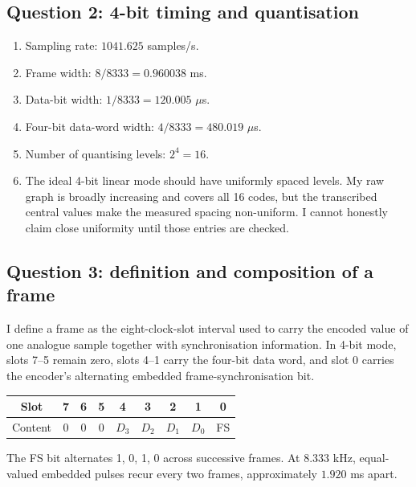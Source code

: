 \documentclass[11pt,a4paper]{article}
\begin{document}
\subsection{Question 2: 4-bit timing and quantisation}
\begin{answerbox}
\begin{enumerate}[label=(\alph*)]
\item Sampling rate: $1041.625$ samples/s.
\item Frame width: $8/8333=0.960038$ ms.
\item Data-bit width: $1/8333=120.005$ $\mu$s.
\item Four-bit data-word width: $4/8333=480.019$ $\mu$s.
\item Number of quantising levels: $2^4=16$.
\item The ideal 4-bit linear mode should have uniformly spaced levels. My raw graph is broadly increasing and covers all 16 codes, but the transcribed central values make the measured spacing non-uniform. I cannot honestly claim close uniformity until those entries are checked.
\end{enumerate}
\end{answerbox}

\subsection{Question 3: definition and composition of a frame}
\begin{answerbox}
I define a frame as the eight-clock-slot interval used to carry the encoded value of one analogue sample together with synchronisation information. In 4-bit mode, slots 7--5 remain zero, slots 4--1 carry the four-bit data word, and slot 0 carries the encoder's alternating embedded frame-synchronisation bit.

\begin{center}
\begin{tabular}{c|c|c|c|c|c|c|c|c}
\toprule
Slot & 7 & 6 & 5 & 4 & 3 & 2 & 1 & 0 \\
\midrule
Content & 0 & 0 & 0 & $D_3$ & $D_2$ & $D_1$ & $D_0$ & FS \\
\bottomrule
\end{tabular}
\end{center}
The FS bit alternates 1, 0, 1, 0 across successive frames. At 8.333 kHz, equal-valued embedded pulses recur every two frames, approximately $1.920$ ms apart.
\end{answerbox}
\end{document}

